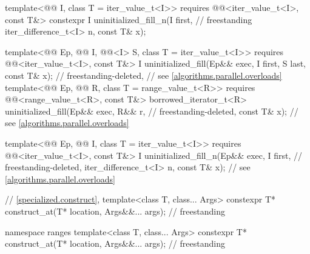 \begin{codeblock}
{{    template<@@ I, class T = iter_value_t<I>>
      requires @@<iter_value_t<I>, const T&>
        constexpr I uninitialized_fill_n(I first,                                   // freestanding
                                         iter_difference_t<I> n, const T& x);

    template<@@ Ep, @@ I,
             @@<I> S, class T = iter_value_t<I>>
      requires @@<iter_value_t<I>, const T&>
        I uninitialized_fill(Ep&& exec, I first, S last, const T& x);       // freestanding-deleted,
                                                                            // see \ref{algorithms.parallel.overloads}
    template<@@ Ep, @@ R,
             class T = range_value_t<R>>
      requires @@<range_value_t<R>, const T&>
        borrowed_iterator_t<R> uninitialized_fill(Ep&& exec, R&& r,         // freestanding-deleted,
                                                  const T& x);              // see \ref{algorithms.parallel.overloads}

    template<@@ Ep, @@ I, class T = iter_value_t<I>>
      requires @@<iter_value_t<I>, const T&>
        I uninitialized_fill_n(Ep&& exec, I first,                          // freestanding-deleted,
                               iter_difference_t<I> n, const T& x);         // see \ref{algorithms.parallel.overloads}
  }

  // \ref{specialized.construct}, 
  template<class T, class... Args>
    constexpr T* construct_at(T* location, Args&&... args);                         // freestanding

  namespace ranges {
    template<class T, class... Args>
      constexpr T* construct_at(T* location, Args&&... args);                       // freestanding
  }

}
\end{codeblock}
